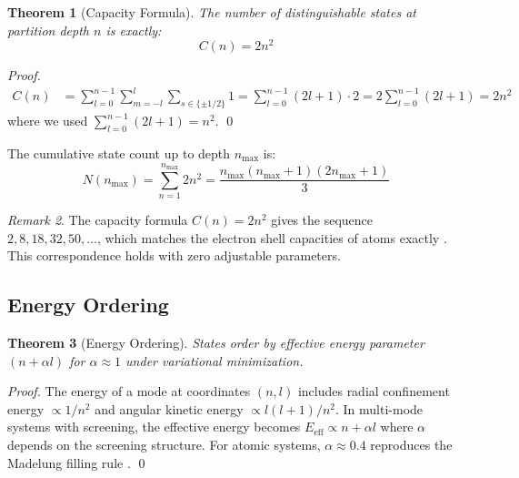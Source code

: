 \documentclass[twocolumn,10pt,a4paper]{article}
\newtheorem{theorem}{Theorem}[section]
\theoremstyle{definition}
\theoremstyle{remark}
\newtheorem{remark}[theorem]{Remark}
\begin{document}
\begin{theorem}[Capacity Formula]
\label{thm:capacity}
The number of distinguishable states at partition depth $n$ is exactly:
\begin{equation}
    C(n) = 2n^2
    \label{eq:capacity}
\end{equation}
\end{theorem}

\begin{proof}
\begin{align}
    C(n) &= \sum_{l=0}^{n-1} \sum_{m=-l}^{l} \sum_{s \in \{\pm 1/2\}} 1 = \sum_{l=0}^{n-1} (2l+1) \cdot 2 = 2\sum_{l=0}^{n-1} (2l+1) = 2n^2
\end{align}
where we used $\sum_{l=0}^{n-1}(2l+1) = n^2$. \qed
\end{proof}

The cumulative state count up to depth $n_{\max}$ is:
\begin{equation}
    N(n_{\max}) = \sum_{n=1}^{n_{\max}} 2n^2 = \frac{n_{\max}(n_{\max}+1)(2n_{\max}+1)}{3}
    \label{eq:cumulative}
\end{equation}

\begin{remark}
The capacity formula $C(n) = 2n^2$ gives the sequence $2, 8, 18, 32, 50, \ldots$, which matches the electron shell capacities of atoms exactly \citep{bohr1913,pauli1925}. This correspondence holds with zero adjustable parameters.
\end{remark}

\subsection{Energy Ordering}

\begin{theorem}[Energy Ordering]
\label{thm:energy-ordering}
States order by effective energy parameter $(n + \alpha l)$ for $\alpha \approx 1$ under variational minimization.
\end{theorem}

\begin{proof}
The energy of a mode at coordinates $(n, l)$ includes radial confinement energy $\propto 1/n^2$ and angular kinetic energy $\propto l(l+1)/n^2$. In multi-mode systems with screening, the effective energy becomes $E_{\text{eff}} \propto n + \alpha l$ where $\alpha$ depends on the screening structure. For atomic systems, $\alpha \approx 0.4$ reproduces the Madelung filling rule \citep{madelung1936}. \qed
\end{proof}
\end{document}
